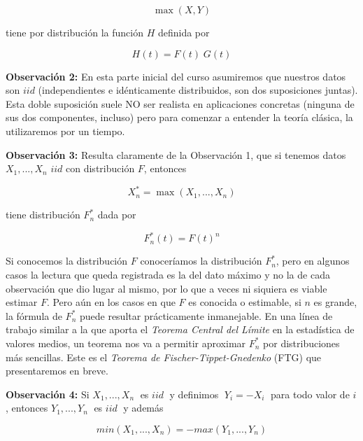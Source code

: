 \documentclass[
]{book}
\theoremstyle{definition}
\theoremstyle{definition}
\theoremstyle{definition}
\theoremstyle{definition}
\theoremstyle{remark}
\begin{document}
\begin{equation}
\max \left( X,Y \right)
\label{eq:1}
\end{equation}

tiene por distribución la función \(H\) definida por

\begin{equation}
H(t)= F(t)\; G(t)
\label{eq:2}
\end{equation}

\textbf{Observación 2:} En esta parte inicial del curso
asumiremos que nuestros datos son \(iid\)
(independientes e idénticamente distribuidos, son
dos suposiciones juntas). Esta doble suposición
suele NO ser realista en aplicaciones concretas
(ninguna de sus dos componentes, incluso) pero
para comenzar a entender la teoría clásica, la
utilizaremos por un tiempo.

\textbf{Observación 3:} Resulta claramente de la
Observación 1, que si tenemos datos \(X_1,...,X_n\) \(iid\) con distribución \(F\), entonces

\begin{equation}
X_n^{\ast}= \max \left( X_1,...,X_n \right)
\end{equation}

tiene distribución \(F_n^\ast\) dada por

\begin{equation}
F_n^\ast (t) = F(t)^n
\end{equation}

Si conocemos la distribución \(F\) conoceríamos la
distribución \(F_n^\ast\), pero en algunos casos la lectura
que queda registrada es la del dato máximo y no la
de cada observación que dio lugar al mismo, por lo
que a veces ni siquiera es viable estimar \(F\).
Pero aún en los casos en que \(F\) es conocida o
estimable, si \(n\) es grande, la fórmula de \(F_n^\ast\) puede resultar prácticamente inmanejable. En una línea de trabajo similar a la que aporta el \emph{Teorema
Central del Límite} en la estadística de valores
medios, un teorema nos va a permitir aproximar
\(F_n^\ast\) por distribuciones más sencillas. Este es el
\emph{Teorema de Fischer-Tippet-Gnedenko} (FTG) que presentaremos en breve.

\textbf{Observación 4:} Si \(X_1,...,X_n\;\) es \(iid\;\) y definimos
\(\;Y_i = -X_i\;\) para todo valor de \(i\), entonces \(Y_1,...,Y_n\;\) es \(iid\;\) y además

\begin{equation}
min(X_1,...,X_n) = - max(Y_1,...,Y_n)
\end{equation}
\end{document}
